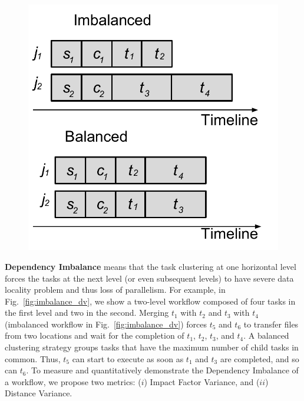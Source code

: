 \begin{figure}[htb]
	\centering
	\includegraphics[width=0.6\linewidth]{figures/imbalance/rv.pdf}
	\label{fig:imbalance_rv}
\end{figure}





\textbf{Dependency Imbalance} means that the task clustering at one horizontal level forces the tasks at the next level (or even subsequent levels) to have severe data locality problem and thus loss of parallelism. For example, in Fig.~\ref{fig:imbalance_dv}, we show a two-level workflow composed of four tasks in the first level and two in the second. Merging $t_1$ with $t_2$ and $t_3$ with $t_4$ (imbalanced workflow in Fig.~\ref{fig:imbalance_dv}) forces $t_5$ and $t_6$ to transfer files from two locations and wait for the completion of $t_1$, $t_2$, $t_3$, and $t_4$.  A balanced clustering strategy groups tasks that have the maximum number of child tasks in common. Thus, $t_5$ can start to execute as soon as $t_1$ and $t_3$ are completed, and so can $t_6$. To measure and quantitatively demonstrate the Dependency Imbalance of a workflow, we propose two  metrics: ($i$) Impact Factor Variance, and ($ii$) Distance Variance. 

